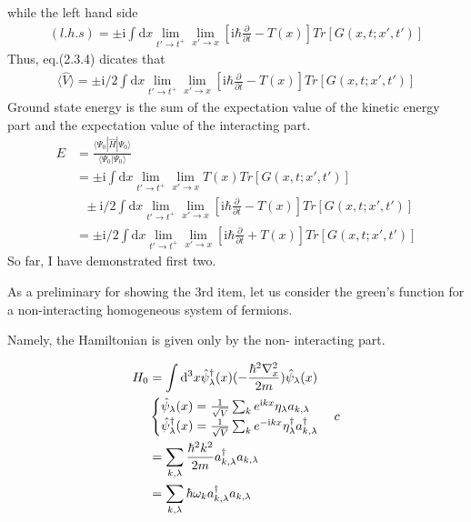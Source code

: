 while the left hand side
\begin{align}
(l.h.s)=\pm \mathrm{i} \int \mathrm{d}x \lim_{t' \rightarrow t^+} \lim_{x' \rightarrow x} [\mathrm{i}\hbar\frac{\partial}{\partial t}-T(x)] Tr[G(x,t;x',t')] \nonumber
\end{align}
Thus, eq.(2.3.4) dicates that 
\begin{align}
\langle \hat V\rangle=\pm \mathrm{i}/2 \int \mathrm{d}x \lim_{t' \rightarrow t^+} \lim_{x' \rightarrow x} [\mathrm{i}\hbar\frac{\partial}{\partial t}-T(x)] Tr[G(x,t;x',t')] \nonumber
\end{align}
Ground state energy is the sum of the expectation value of the kinetic energy part and the expectation value of the interacting part.
\begin{align}
E&=\frac{\langle\Psi_0|\hat H
|\Psi_0\rangle}{\langle\Psi_0|\Psi_0\rangle} \nonumber \\
&=\pm \mathrm{i} \int \mathrm{d}x \lim_{t' \rightarrow t^+} \lim_{x' \rightarrow x} T(x) Tr[G(x,t;x',t')]\nonumber \\
&\ \ \ \pm \mathrm{i}/2 \int \mathrm{d}x \lim_{t' \rightarrow t^+} \lim_{x' \rightarrow x} [\mathrm{i}\hbar\frac{\partial}{\partial t}-T(x)] Tr[G(x,t;x',t')] \nonumber\\
&=\pm \mathrm{i}/2 \int \mathrm{d}x \lim_{t' \rightarrow t^+} \lim_{x' \rightarrow x} [\mathrm{i}\hbar\frac{\partial}{\partial t}+T(x)] Tr[G(x,t;x',t')] \nonumber
\end{align}
So far, I have demonstrated first two.

As a preliminary for showing the 3rd item, let us consider the green's function for a non-interacting homogeneous system of fermions.

Namely, the Hamiltonian is given only by the non- interacting part.

\begin{align}
H_0&=\int \mathrm{d}^3x \hat\psi^{\dagger}_{\lambda}(x)(-\frac{\hbar^2\nabla^2_x}{2m})\hat\psi_{\lambda}(x)\nonumber \\
&
\begin{cases}
\hat\psi_{\lambda}(x)=\frac{1}{\sqrt{V}}\sum_{k}e^{\mathrm{i}kx}\eta_{\lambda}a_{k,\lambda} \cr
\hat\psi^{\dagger}_{\lambda}(x)=\frac{1}{\sqrt{V}}\sum_{k}e^{-\mathrm{i}kx}\eta_{\lambda}^{\dagger}a_{k,\lambda}^{\dagger}
\end{cases}c\nonumber \\
&=\sum_{k,\lambda}\frac{\hbar^2k^2}{2m} a_{k,\lambda}^{\dagger}a_{k,\lambda} \nonumber \\
&=\sum_{k,\lambda}\hbar\omega_{k} a_{k,\lambda}^{\dagger}a_{k,\lambda} \nonumber
\end{align}

